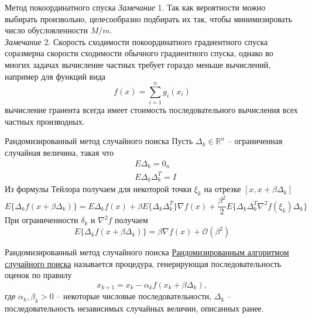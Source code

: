 \documentclass[10pt, handout]{beamer}
\begin{document}
\begin{frame}{Метод покоординатного спуска}
\textit{Замечание} 1. Так как вероятности можно выбирать произвольно, целесообразно подбирать их так, чтобы минимизировать число обусловленности $M/m$.\\
\vspace{1em}
\pause
\textit{Замечание} 2. Скорость сходимости покоординатного градиентного спуска соразмерна скорости сходимости обычного градиентного спуска, однако во многих
задачах вычисление частных требует гораздо меньше вычислений, например для функций вида
$$
f(x)=\sum_{i=1}^ng_i(x_i)
$$
вычисление граиента всегда имеет стоимость последовательного вычисления всех частных производных.\\
\end{frame}

\begin{frame}{Рандомизированный метод случайного поиска}
Пусть $\Delta_k\in \mathbb{R}^n$ -- ограниченная случайная величина, такая что
\begin{align*}
&E\Delta_k=0_n\\
&E\Delta_k\Delta_k^T=I
\end{align*}
\pause
Из формулы Тейлора получаем для некоторой точки $\xi_k$ на отрезке $[x, x+\beta\Delta_k]$
$$
E\{\Delta_k f(x+\beta\Delta_k)\}=E\Delta_k f(x)+\beta E\{\Delta_k\Delta_k^T\}\nabla f(x)+\frac{\beta^2}{2}E\{\Delta_k\Delta_k^T\nabla^2 f(\xi_k)\Delta_k\}
$$
\pause
При ограниченности $\delta_k$ и $\nabla^2 f$ получаем
$$
E\{\Delta_k f(x+\beta\Delta_k)\}=\beta\nabla f(x)+\mathcal{O}(\beta^2)
$$
\end{frame}

\begin{frame}{Рандомизированный метод случайного поиска}
\underline{Рандомизированным алгоритмом случайного поиска} называется процедура, генерирующая последовательность оценок по правилу
\begin{equation}\label{rand_descent}
x_{k+1}=x_k-\alpha_kf(x_k+\beta\Delta_k),
\end{equation}
где $\alpha_k, \beta_k>0$ -- некоторые числовые последовательности, $\Delta_k$ -- последовательность независимых случайных величин, описанных ранее.
\end{frame}
\end{document}
